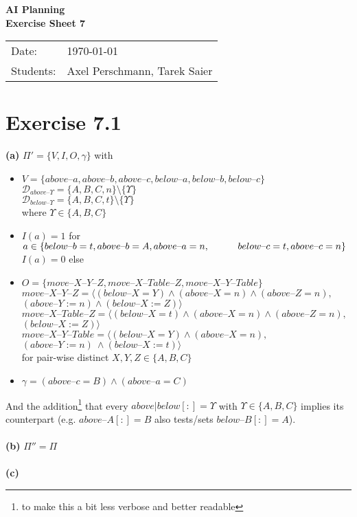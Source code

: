 \documentclass[11pt,a4paper]{article}
\newcommand{\sheetNr}{7}
\newcommand{\h}[0]{\text{--}}
\begin{document}
\begin{center}
\Huge{\textbf{AI Planning}}\\
\LARGE{\textbf{Exercise Sheet \sheetNr}}
\end{center}
\vspace{2cm}
\begin{tabular}{ll}
Date: & \today\\
Students: & Axel Perschmann, Tarek Saier
\end{tabular}

\section*{Exercise 7.1}
\textbf{(a)} $\Pi'=\{V,I,O,\gamma\}$ with\\
\begin{itemize}
\item $V=\{above\h a,above\h b,above\h c,below\h a,below\h b,below\h c\}$\\
$\mathscr{D}_{above\h\Upsilon}=\{A,B,C,n\}\setminus\{\Upsilon\}$\\
$\mathscr{D}_{below\h\Upsilon}=\{A,B,C,t\}\setminus\{\Upsilon\}$\\
where $\Upsilon\in\{A,B,C\}$

\item $I(a)=1$ for $a\in \{below\h b=t,above\h b=A,above\h a=n,\\
\hphantom{wwww}below\h c=t,above\h c=n\}$\\
$I(a)=0$ else

\item $O=\{move\h X\h Y\h Z,move\h X\h Table\h Z,move\h X\h Y\h Table\}$\\
$move\h X\h Y\h Z=\langle (below\h X=Y) \land (above\h X=n) \land (above\h Z=n),$\\
\hphantom{wwww}$(above\h Y:=n) \land (below\h X:=Z) \rangle$\\
$move\h X\h Table\h Z=\langle(below\h X=t) \land (above\h X=n) \land (above\h Z=n),$\\
\hphantom{wwww}$(below\h X:=Z)\rangle$\\
$move\h X\h Y\h Table=\langle(below\h X=Y) \land (above\h X=n),$\\
\hphantom{wwww}$(above\h Y:=n)\ \land (below\h X:=t)\rangle$\\
for pair-wise distinct $X,Y,Z\in\{A,B,C\}$

\item $\gamma=(above\h c=B)\land(above\h a=C)$
\end{itemize}
And the addition\footnote{to make this a bit less verbose and better readable} that every $above|below[:]$$=\Upsilon$ with $\Upsilon\in\{A,B,C\}$ implies its counterpart (e.g. $above\h A[:]$$=B$ also tests/sets $below\h B[:]$$=A$).\\
\\
\textbf{(b)} $\Pi''=\Pi$\\
\\
\textbf{(c)}
\newpage
\end{document}
